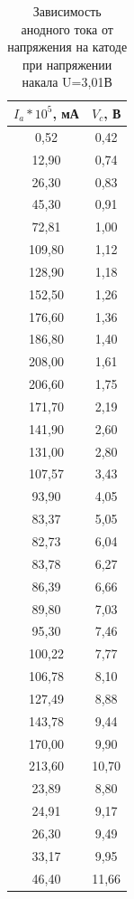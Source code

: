 \documentclass[a4paper,12pt]{article}
\begin{document}
\newpage

\begin{table}[h]
\centering
\caption{Зависимость анодного тока от напряжения на катоде при напряжении накала U=3,01В}
\label{table3:VAC_2}
\begin{tabular}{|c|c|}
\hline
$I_a *10^5$, мА & $V_c$, В \\ \hline
0,52 & 0,42 \\ \hline
12,90 & 0,74 \\ \hline
26,30 & 0,83 \\ \hline
45,30 & 0,91 \\ \hline
72,81 & 1,00 \\ \hline
109,80 & 1,12 \\ \hline
128,90 & 1,18 \\ \hline
152,50 & 1,26 \\ \hline
176,60 & 1,36 \\ \hline
186,80 & 1,40 \\ \hline
208,00 & 1,61 \\ \hline
206,60 & 1,75 \\ \hline
171,70 & 2,19 \\ \hline
141,90 & 2,60 \\ \hline
131,00 & 2,80 \\ \hline
107,57 & 3,43 \\ \hline
93,90 & 4,05 \\ \hline
83,37 & 5,05 \\ \hline
82,73 & 6,04 \\ \hline
83,78 & 6,27 \\ \hline
86,39 & 6,66 \\ \hline
89,80 & 7,03 \\ \hline
95,30 & 7,46 \\ \hline
100,22 & 7,77 \\ \hline
106,78 & 8,10 \\ \hline
127,49 & 8,88 \\ \hline
143,78 & 9,44 \\ \hline
170,00 & 9,90 \\ \hline
213,60 & 10,70 \\ \hline
23,89 & 8,80 \\ \hline
24,91 & 9,17 \\ \hline
26,30 & 9,49 \\ \hline
33,17 & 9,95 \\ \hline
46,40 & 11,66 \\ \hline
\end{tabular}
\end{table}
\end{document}
